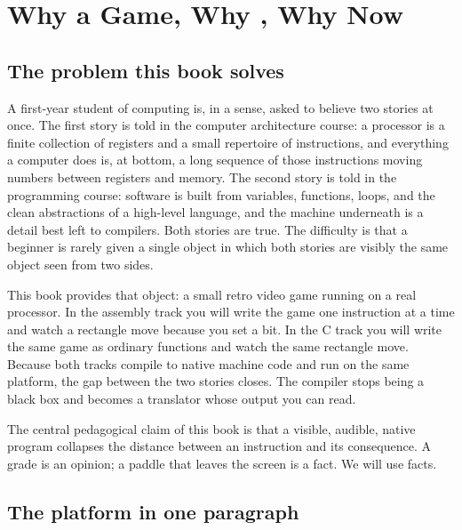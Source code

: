 \chapter{Why a Game, Why \riscv, Why Now}
\label{ch:intro}

\section{The problem this book solves}

A first-year student of computing is, in a sense, asked to believe two stories at
once. The first story is told in the computer architecture course: a processor is
a finite collection of registers and a small repertoire of instructions, and
everything a computer does is, at bottom, a long sequence of those instructions
moving numbers between registers and memory. The second story is told in the
programming course: software is built from variables, functions, loops, and the
clean abstractions of a high-level language, and the machine underneath is a
detail best left to compilers. Both stories are true. The difficulty is that a
beginner is rarely given a single object in which both stories are visibly the
same object seen from two sides.

This book provides that object: a small retro video game running on a real
\riscv processor. In the assembly track you will write the game one instruction
at a time and watch a rectangle move because you set a bit. In the C track you
will write the same game as ordinary functions and watch the same rectangle move.
Because both tracks compile to native \riscv machine code and run on the same
platform, the gap between the two stories closes. The compiler stops being a
black box and becomes a translator whose output you can read.

\begin{prgconcept}
The central pedagogical claim of this book is that a visible, audible, native
program collapses the distance between an instruction and its consequence. A
grade is an opinion; a paddle that leaves the screen is a fact. We will use facts.
\end{prgconcept}

\section{The platform in one paragraph}

